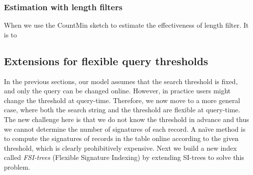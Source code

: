 \subsubsection{Estimation with length filters}

When we use the CountMin sketch to estimate the effectiveness of length filter. It is to

%
%
%
%
%
%
%
%
%


\subsection{Extensions for flexible query thresholds} \label{subsec:flexible}

In the previous sections, our model assumes that the search threshold is fixed, and only the query can be changed online. However, in practice users might change the threshold at query-time. Therefore, we now move to a more general case, where both the search string and the threshold are flexible at query-time. The new challenge here is that we do not know the threshold in advance and thus we cannot determine the number of signatures of each record. A na\"{i}ve method is to compute the signatures of records in the table online according to the given threshold, which  is clearly prohibitively expensive. Next we build a new index called \textit{FSI-trees} (Flexible Signature Indexing) by extending SI-trees to solve this problem.

